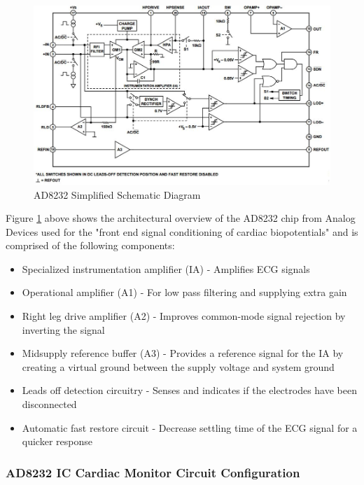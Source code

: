 \begin{figure}[H]
	\centering
	\includegraphics[width=\linewidth]{ad8232schematic.jpg}
	\caption{AD8232 Simplified Schematic Diagram \cite{ad8232datasheet}}
	\label{ad8232schematic}
\end{figure}

Figure \ref{ad8232schematic} above shows the architectural overview of the AD8232 chip from Analog Devices used for the "front end signal conditioning of cardiac biopotentials" \cite{ad8232datasheet} and is comprised of the following components: 

\begin{itemize}
	\item Specialized instrumentation amplifier (IA) - Amplifies ECG signals 
	\item Operational amplifier (A1) - For low pass filtering and supplying extra gain 
	\item Right leg drive amplifier (A2) - Improves common-mode signal rejection by inverting the signal 
	\item Midsupply reference buffer (A3) - Provides a reference signal for the IA by creating a virtual ground between the supply voltage and system ground 
	\item Leads off detection circuitry - Senses and indicates if the electrodes have been disconnected
	\item Automatic fast restore circuit - Decrease settling time of the ECG signal for a quicker response 
\end{itemize} 

\subsubsection*{AD8232 IC Cardiac Monitor Circuit Configuration}


